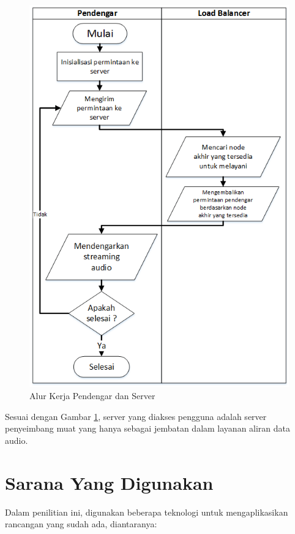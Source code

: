 \begin{figure}
    \centering
    \includegraphics[width=0.7\linewidth]{dengar-server}
    \caption{Alur Kerja Pendengar dan Server}
    \label{fig:dengar-server}
\end{figure}

Sesuai dengan Gambar \ref{fig:dengar-server}, server yang diakses pengguna adalah server penyeimbang muat yang hanya sebagai jembatan dalam layanan aliran data audio. 

\section{Sarana Yang Digunakan}

Dalam penilitian ini, digunakan beberapa teknologi untuk mengaplikasikan rancangan yang sudah ada, diantaranya:

